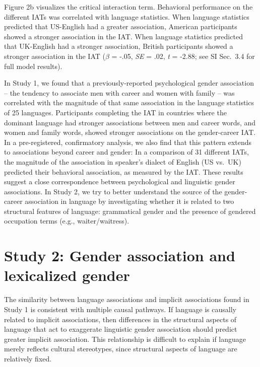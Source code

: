 \documentclass[9pt,twocolumn]{pnas-new}
\begin{document}
Figure 2b visualizes the critical interaction term. Behavioral performance on the different IATs was correlated with language statistics. When language statistics predicted that US-English had a greater association, American participants showed a stronger association in the IAT. When language statistics predicted that UK-English had a stronger association, British participants showed a stronger association in the IAT (\(\beta\) = -.05, \emph{SE} = .02, \emph{t} = -2.88; see SI Sec.\ 3.4 for full model results).

In Study 1, we found that a previously-reported psychological gender association – the tendency to associate men with career and women with family – was correlated with the magnitude of that same association in the language statistics of 25 languages. Participants completing the IAT in countries where the dominant language had stronger associations between men and career words, and women and family words, showed stronger associations on the gender-career IAT. In a pre-registered, confirmatory analysis, we also find that this pattern extends to associations beyond career and gender: In a comparison of 31 different IATs, the magnitude of the association in speaker’s dialect of English (US vs.\ UK) predicted their behavioral association, as measured by the IAT. These results suggest a close correspondence between psychological and linguistic gender associations. In Study 2, we try to
better understand the source of the gender-career association in language by investigating whether it is related to two structural features of
language: grammatical gender and the presence of gendered occupation
terms (e.g., waiter/waitress). 


\section*{Study 2: Gender association and lexicalized
gender}\label{study-2-gender-bias-and-lexicalized-gender}

The similarity between language associations and implicit associations found in Study 1 is consistent with multiple causal pathways. If language is causally related to implicit associations, then differences in the structural aspects of language that act to exaggerate linguistic gender association should predict greater implicit association. This relationship is difficult to explain if language merely reflects cultural stereotypes, since structural aspects of language are relatively fixed.
\end{document}
